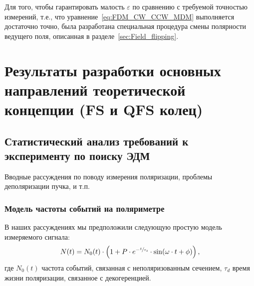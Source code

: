 \documentclass{report}
\newcommand{\LTd}{\tau_d}
\begin{document}
Для того, чтобы гарантировать малость $\varepsilon$ по сравнению с требуемой точностью измерений, т.е., что уравнение~\eqref{eq:FDM_CW_CCW_MDM} выполняется достаточно точно, была разработана специальная процедура смены полярности ведущего поля, описанная в разделе~\ref{sec:Field_flipping}.



\chapter{Результаты разработки основных направлений теоретической концепции (FS и QFS колец)}
\section{Статистический анализ требований к эксперименту по поиску
  ЭДМ}

Вводные рассуждения по поводу измерения поляризации, проблемы
деполяризации пучка, и т.п.

\subsection{Модель частоты событий на поляриметре}
В наших рассуждениях мы предположили следующую простую модель
измеряемого сигнала:
\begin{equation}\label{eq:DetCntRt}
	N(t) = N_0(t)\cdot\bkt{1 + P\cdot e^{-\sfrac{t}{\LTd}}\cdot\sin(\omega\cdot t + \phi)},
\end{equation}
где $N_0(t)$ частота событий, связанная с неполяризованным сечением,
$\LTd$ время жизни поляризации, связанное с декогеренцией.
\end{document}
